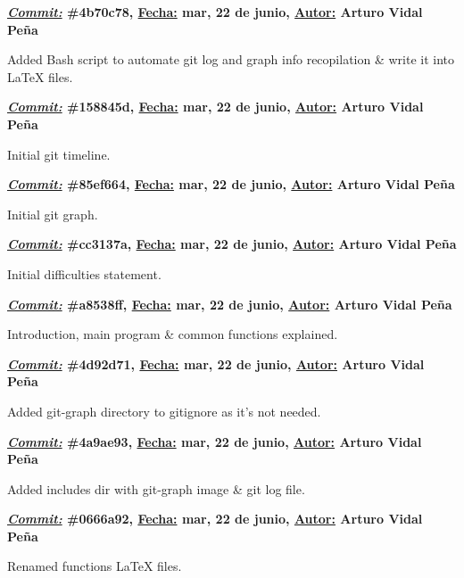 \item \textbf{\underline{\textit{Commit:}} \#4b70c78, \underline{Fecha:} mar, 22 de junio, \underline{Autor:} Arturo Vidal Peña}\\\item[] Added Bash script to automate git log and graph info recopilation \& write it into LaTeX files.\\
\item \textbf{\underline{\textit{Commit:}} \#158845d, \underline{Fecha:} mar, 22 de junio, \underline{Autor:} Arturo Vidal Peña}\\\item[] Initial git timeline.\\
\item \textbf{\underline{\textit{Commit:}} \#85ef664, \underline{Fecha:} mar, 22 de junio, \underline{Autor:} Arturo Vidal Peña}\\\item[] Initial git graph.\\
\item \textbf{\underline{\textit{Commit:}} \#cc3137a, \underline{Fecha:} mar, 22 de junio, \underline{Autor:} Arturo Vidal Peña}\\\item[] Initial difficulties statement.\\
\item \textbf{\underline{\textit{Commit:}} \#a8538ff, \underline{Fecha:} mar, 22 de junio, \underline{Autor:} Arturo Vidal Peña}\\\item[] Introduction, main program \& common functions explained.\\
\item \textbf{\underline{\textit{Commit:}} \#4d92d71, \underline{Fecha:} mar, 22 de junio, \underline{Autor:} Arturo Vidal Peña}\\\item[] Added git-graph directory to gitignore as it's not needed.\\
\item \textbf{\underline{\textit{Commit:}} \#4a9ae93, \underline{Fecha:} mar, 22 de junio, \underline{Autor:} Arturo Vidal Peña}\\\item[] Added includes dir with git-graph image \& git log file.\\
\item \textbf{\underline{\textit{Commit:}} \#0666a92, \underline{Fecha:} mar, 22 de junio, \underline{Autor:} Arturo Vidal Peña}\\\item[] Renamed functions LaTeX files.\\
